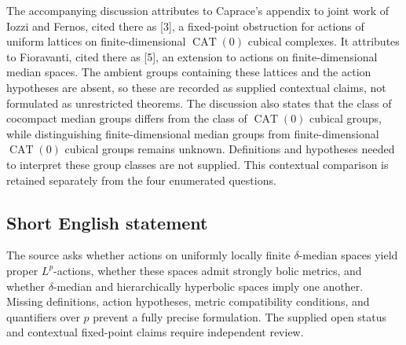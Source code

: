 \documentclass[11pt]{article}
\begin{document}
The accompanying discussion attributes to Caprace's appendix to joint work of Iozzi and Fernos, cited there as [3], a fixed-point obstruction for actions of uniform lattices on finite-dimensional \(\operatorname{CAT}(0)\) cubical complexes. It attributes to Fioravanti, cited there as [5], an extension to actions on finite-dimensional median spaces. The ambient groups containing these lattices and the action hypotheses are absent, so these are recorded as supplied contextual claims, not formulated as unrestricted theorems. The discussion also states that the class of cocompact median groups differs from the class of \(\operatorname{CAT}(0)\) cubical groups, while distinguishing finite-dimensional median groups from finite-dimensional \(\operatorname{CAT}(0)\) cubical groups remains unknown. Definitions and hypotheses needed to interpret these group classes are not supplied. This contextual comparison is retained separately from the four enumerated questions.
\subsection{Short English statement}
The source asks whether actions on uniformly locally finite \(\delta\)-median spaces yield proper \(L^p\)-actions, whether these spaces admit strongly bolic metrics, and whether \(\delta\)-median and hierarchically hyperbolic spaces imply one another. Missing definitions, action hypotheses, metric compatibility conditions, and quantifiers over \(p\) prevent a fully precise formulation. The supplied open status and contextual fixed-point claims require independent review.
\end{document}
